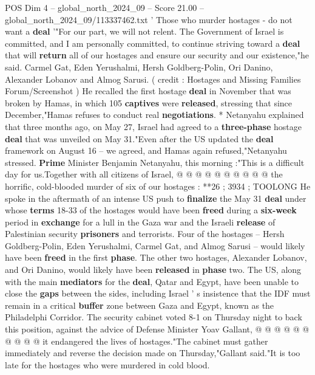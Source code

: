 \begin{textsample}{POS Dim 4 – global\_north\_2024\_09 – Score 21.00 – global\_north\_2024\_09/113337462.txt}  \label{ex:f4_pos_313}
' Those who murder hostages - do not want a \textbf{deal} '"For our part, we will not relent.
The Government of Israel is committed, and I am personally committed, to continue striving toward a \textbf{deal} that will \textbf{return} all of our hostages and ensure our security and our existence,"he said.
Carmel Gat, Eden Yerushalmi, Hersh Goldberg-Polin, Ori Danino, Alexander Lobanov and Almog Sarusi. ( credit : Hostages and Missing Families Forum/Screenshot ) He recalled the first hostage \textbf{deal} in November that was broken by Hamas, in which 105 \textbf{captives} were \textbf{released}, stressing that since December,"Hamas refuses to conduct real \textbf{negotiations}. * Netanyahu explained that three months ago, on May 27, Israel had agreed to a \textbf{three-phase} hostage \textbf{deal} that was unveiled on May 31."Even after the US updated the \textbf{deal} framework on August 16 -- we agreed, and Hamas again refused,"Netanyahu stressed. \textbf{Prime} Minister Benjamin Netanyahu, this morning :"This is a difficult day for us.Together with all citizens of Israel, @ @ @ @ @ @ @ @ @ @ the horrific, cold-blooded murder of six of our hostages : **26 ; 3934 ; TOOLONG He spoke in the aftermath of an intense US push to \textbf{finalize} the May 31 \textbf{deal} under whose \textbf{terms} 18-33 of the hostages would have been \textbf{freed} during a \textbf{six-week} period in \textbf{exchange} for a lull in the Gaza war and the Israeli \textbf{release} of Palestinian security \textbf{prisoners} and terrorists.
Four of the hostages -- Hersh Goldberg-Polin, Eden Yerushalmi, Carmel Gat, and Almog Sarusi -- would likely have been \textbf{freed} in the first \textbf{phase}.
The other two hostages, Alexander Lobanov, and Ori Danino, would likely have been \textbf{released} in \textbf{phase} two.
The US, along with the main \textbf{mediators} for the \textbf{deal}, Qatar and Egypt, have been unable to close the \textbf{gaps} between the sides, including Israel ' s insistence that the IDF must remain in a critical \textbf{buffer} zone between Gaza and Egypt, known as the Philadelphi Corridor.
The security cabinet voted 8-1 on Thursday night to back this position, against the advice of Defense Minister Yoav Gallant, @ @ @ @ @ @ @ @ @ @ it endangered the lives of hostages."The cabinet must gather immediately and reverse the decision made on Thursday,"Gallant said."It is too late for the hostages who were murdered in cold blood.

\end{textsample}
